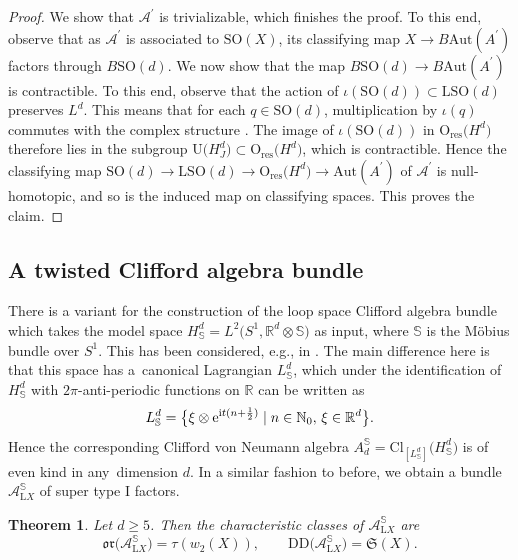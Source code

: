 \documentclass[pdftex]{sigma}
\numberwithin{equation}{section}
\newtheorem{Theorem}{Theorem}[section]
\newcommand{\R}{\mathbb{R}}
\newcommand{\N}{\mathbb{N}}
\newcommand{\A}{\mathcal{A}}
\newcommand{\Cl}{\mathrm{Cl}}
\newcommand{\SO}{\mathrm{SO}}
\newcommand{\res}{\mathrm{res}}
\newcommand{\Aut}{\mathrm{Aut}}
\newcommand{\U}{\mathrm{U}}
\renewcommand{\O}{\mathrm{O}}
\renewcommand{\L}{\mathrm{L}}
\newcommand{\DD}{\mathrm{DD}}
\newcommand{\oclass}{\mathfrak{or}}
\begin{document}
\begin{proof}
We show that $\mathcal{A}^\prime$ is trivializable, which finishes the proof.
To this end, observe that as $\mathcal{A}^\prime$ is associated to $\SO(X)$, its classifying map $X \to B\Aut(A^\prime)$ factors through $B\SO(d)$.
We now show that the map $B\SO(d) \to B\Aut(A^\prime)$ is contractible.
To this end, observe that the action of $\iota(\SO(d)) \subset \L \SO(d)$ preserves $L^d$.
This means that for each $q \in \SO(d)$, multiplication by $\iota(q)$ commutes with the complex structure .
The image of $\iota(\SO(d))$ in $\O_{\res}\big(H^d\big)$ therefore lies in the subgroup $\U\big(H^d_J\big) \subset \O_{\res}\big(H^d\big)$, which is contractible.
Hence the classifying map $\SO(d) \to \L\SO(d) \to \O_{\res}\big(H^d\big) \to \Aut(A^\prime)$ of $\mathcal{A}^\prime$ is null-homotopic, and so is the induced map on classifying spaces.
This proves the claim.
\end{proof}

\subsection{A twisted Clifford algebra bundle} \label{SectionTwistedBundle}

There is a variant for the construction of the loop space Clifford algebra bundle which takes the model space $
 H^d_{\mathbb{S}} = L^2\big(S^1, \R^d \otimes \mathbb{S}\big)$ as input, where $\mathbb{S}$ is the M\"obius bundle over $S^1$.
This has been considered, e.g., in \cite[Section~6.2]{KristelWaldorf2}.
The main difference here is that this space has a~canonical Lagrangian $L_{\mathbb{S}}^d$, which under the identification of $H^d_{\mathbb{S}}$ with $2\pi$-anti-periodic functions on $\R$ can be written as
\begin{equation}
\label{OtherLagrangian}
 L^d_{\mathbb{S}} = \big\{ \xi \otimes {\rm e}^{{\rm i}t(n+\frac{1}{2})} \mid n \in \N_0, \, \xi \in \R^d\big\}.
\end{equation}
Hence the corresponding Clifford von Neumann algebra $A_d^{\mathbb{S}} = \Cl_{[L^d_{\mathbb{S}}]}\big(H^d_{\mathbb{S}}\big)$ is of even kind in any~di\-men\-sion $d$.
In a similar fashion to before, we obtain a bundle $\A^{\mathbb{S}}_{\L X}$ of super type I factors.

\begin{Theorem}
Let $d \geq 5$.
Then the characteristic classes of $\A_{\L X}^\mathbb{S}$ are
\begin{equation*}
 \oclass\big(\mathcal{A}_{\L X}^{\mathbb{S}}\big) = \tau(w_2(X)), \qquad \DD\big(\A_{\L X}^{\mathbb{S}}\big) = \mathfrak{S}(X).
\end{equation*}
\end{Theorem}
\end{document}
